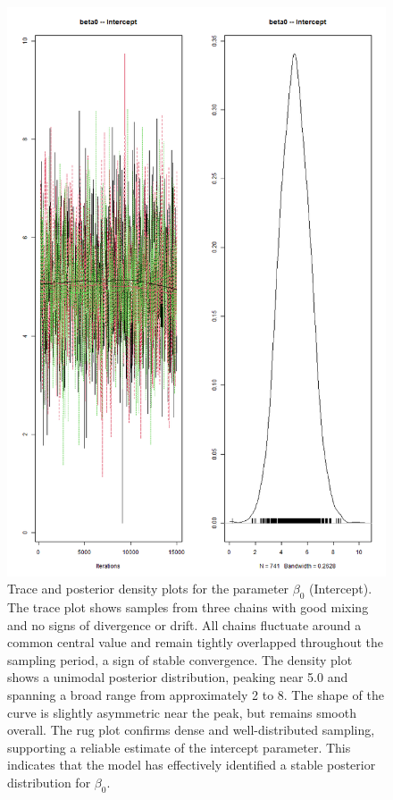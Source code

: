 \documentclass[]{article}
\begin{document}
\begin{figure}[H]
	\centering
	\includegraphics[width=0.7\linewidth]{img/img-trace-beta0}
	\caption{Trace and posterior density plots for the parameter $\beta_0$ (Intercept). The trace plot shows samples from three chains with good mixing and no signs of divergence or drift. All chains fluctuate around a common central value and remain tightly overlapped throughout the sampling period, a sign of stable convergence. The density plot shows a unimodal posterior distribution, peaking near 5.0 and spanning a broad range from approximately 2 to 8. The shape of the curve is slightly asymmetric near the peak, but remains smooth overall. The rug plot confirms dense and well-distributed sampling, supporting a reliable estimate of the intercept parameter. This indicates that the model has effectively identified a stable posterior distribution for $\beta_0$.}
	\end{figure}
\end{document}
